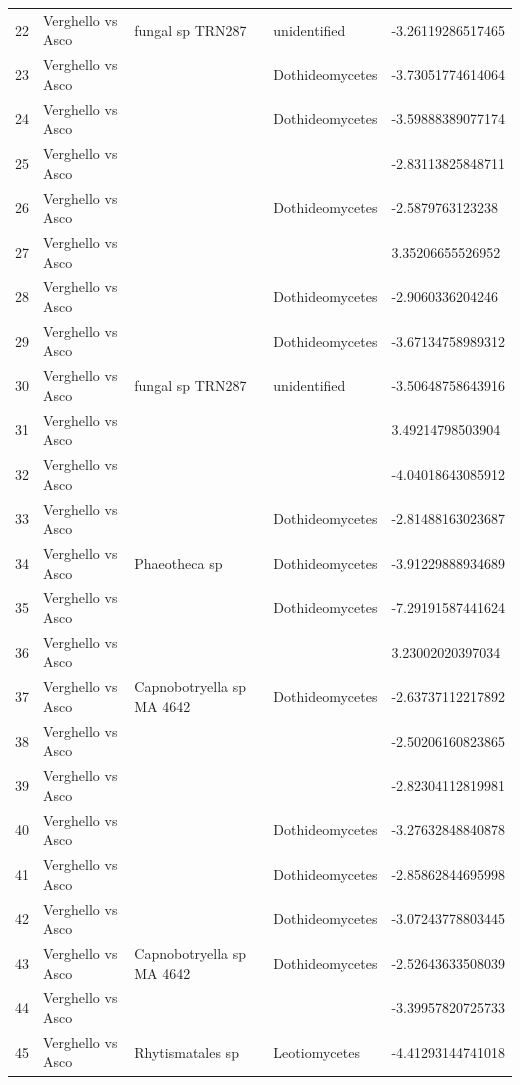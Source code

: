 \documentclass[12pt]{article}\usepackage[]{graphicx}\usepackage[]{color}
\numberwithin{figure}{section}
\begin{document}
\begin{table}[ht]
\begin{tabular}{lllll}
  22 & Verghello vs Asco & fungal sp TRN287 & unidentified & -3.26119286517465 \\ 
  23 & Verghello vs Asco &  & Dothideomycetes & -3.73051774614064 \\ 
  24 & Verghello vs Asco &  & Dothideomycetes & -3.59888389077174 \\ 
  25 & Verghello vs Asco &  &  & -2.83113825848711 \\ 
  26 & Verghello vs Asco &  & Dothideomycetes & -2.5879763123238 \\ 
  27 & Verghello vs Asco &  &  & 3.35206655526952 \\ 
  28 & Verghello vs Asco &  & Dothideomycetes & -2.9060336204246 \\ 
  29 & Verghello vs Asco &  & Dothideomycetes & -3.67134758989312 \\ 
  30 & Verghello vs Asco & fungal sp TRN287 & unidentified & -3.50648758643916 \\ 
  31 & Verghello vs Asco &  &  & 3.49214798503904 \\ 
  32 & Verghello vs Asco &  &  & -4.04018643085912 \\ 
  33 & Verghello vs Asco &  & Dothideomycetes & -2.81488163023687 \\ 
  34 & Verghello vs Asco & Phaeotheca sp & Dothideomycetes & -3.91229888934689 \\ 
  35 & Verghello vs Asco &  & Dothideomycetes & -7.29191587441624 \\ 
  36 & Verghello vs Asco &  &  & 3.23002020397034 \\ 
  37 & Verghello vs Asco & Capnobotryella sp MA 4642 & Dothideomycetes & -2.63737112217892 \\ 
  38 & Verghello vs Asco &  &  & -2.50206160823865 \\ 
  39 & Verghello vs Asco &  &  & -2.82304112819981 \\ 
  40 & Verghello vs Asco &  & Dothideomycetes & -3.27632848840878 \\ 
  41 & Verghello vs Asco &  & Dothideomycetes & -2.85862844695998 \\ 
  42 & Verghello vs Asco &  & Dothideomycetes & -3.07243778803445 \\ 
  43 & Verghello vs Asco & Capnobotryella sp MA 4642 & Dothideomycetes & -2.52643633508039 \\ 
  44 & Verghello vs Asco &  &  & -3.39957820725733 \\ 
  45 & Verghello vs Asco & Rhytismatales sp & Leotiomycetes & -4.41293144741018 \\ 

\end{tabular}
\end{table}
\end{document}
